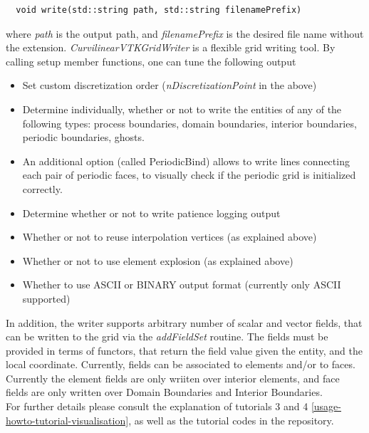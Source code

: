 \begin{mybox}
\begin{lstlisting}
  void write(std::string path, std::string filenamePrefix)
\end{lstlisting}
\end{mybox}
\noindent
where \textit{path} is the output path, and \textit{filenamePrefix} is the desired file name without the extension. \textit{CurvilinearVTKGridWriter} is a flexible grid writing tool. By calling setup member functions, one can tune the following output
\begin{itemize}
 \item Set custom discretization order (\textit{nDiscretizationPoint} in the above)
 \item Determine individually, whether or not to write the entities of any of the following types: process boundaries, domain boundaries, interior boundaries, periodic boundaries, ghosts.
 \item An additional option (called PeriodicBind) allows to write lines connecting each pair of periodic faces, to visually check if the periodic grid is initialized correctly.
 \item Determine whether or not to write patience logging output
 \item Whether or not to reuse interpolation vertices (as explained above)
 \item Whether or not to use element explosion (as explained above)
 \item Whether to use ASCII or BINARY output format (currently only ASCII supported)
\end{itemize}

\noindent
In addition, the writer supports arbitrary number of scalar and vector fields, that can be written to the grid via the \textit{addFieldSet} routine. The fields must be provided in terms of functors, that return the field value given the entity, and the local coordinate. Currently, fields can be associated to elements and/or to faces. Currently the element fields are only wriiten over interior elements, and face fields are only written over Domain Boundaries and Interior Boundaries. \\

\noindent
For further details please consult the explanation of tutorials 3 and 4 \cref{usage-howto-tutorial-visualisation}, as well as the tutorial codes in the repository.


